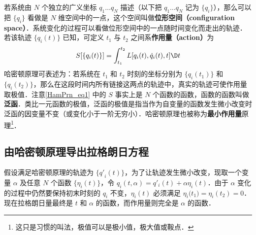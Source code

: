 
若系统由 $N$ 个独立的广义坐标 $q_1\dots q_N$ 描述（以下把 $q_1\dots q_N$ 记为 $\{ {{q_i}} \}$），那么可以把 $\{ {{q_i}} \}$ 看做是 $N$ 维空间中的一点，这个空间叫做\textbf{位形空间（configuration space）}．系统变化的过程可以看做位形空间中的一点随时间变化而走出的轨迹．若该轨迹 $\{ {{q_i}(t)} \}$ 已知，可定义 $t_1$ 与 $t_2$ 之间系\textbf{作用量（action）}为
\begin{equation}\label{HamPrn_eq1}
S[\{ {{q_i}(t)} \}] = \int_{{t_1}}^{{t_2}} {L[{q_i}(t),{{\dot q}_i}(t),t]\D t} 
\end{equation}
哈密顿原理可表述为：若系统在 $t_1$ 和 $t_2$ 时刻的坐标分别为 $\{ {{q_i}({t_1})} \}$ 和 $\{ {{q_i}({t_2})} \}$，那么在这段时间内所有链接这两点的轨迹中，真实的轨迹可使作用量取极值．注意\autoref{HamPrn_eq1} 中的 $S$ 事实上是 $N$ 个函数的函数，函数的函数叫做\textbf{泛函}．类比一元函数的极值，泛函的极值是指当作为自变量的函数发生微小改变时泛函的因变量不变（或变化小于一阶无穷小）．哈密顿原理也被称为\textbf{最小作用量}原理\footnote{这只是习惯的叫法，极值可以是极小值，极大值或鞍点．}．%

\subsection{由哈密顿原理导出拉格朗日方程}

假设满足哈密顿原理的轨迹为 $\{ {{{q'}_i}(t)} \}$，为了让轨迹发生微小改变，现取一个变量 $\alpha$ 及任意 $N$ 个函数 $\{{\eta _i}(t)\}$，令 ${q_i}(t,\alpha ) = {q'_i}(t) + \alpha {\eta _i}(t)$．由于 $\alpha$ 变化的过程中仍然要保持初末时刻的 $q_i$ 不变，$\eta_i(t)$ 必须满足 ${\eta _i}{\text{(}}{t_1}) = {\eta _i}({t_2}) = 0$．现在拉格朗日量最终是 $t$ 和 $\alpha$ 的函数，而作用量则完全是 $\alpha$ 的函数．
 
